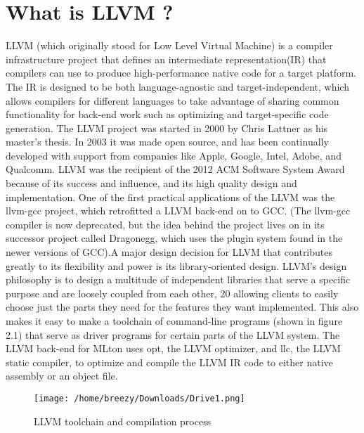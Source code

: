 \documentclass{book}
\begin{document}
	\section{What is LLVM ?}
	LLVM (which originally stood for Low Level Virtual Machine) is a compiler infrastructure project that defines an intermediate representation(IR) that compilers can use to produce high-performance native code for a target platform. The IR is designed to be both language-agnostic and target-independent, which allows compilers for different languages to take advantage of sharing common functionality for back-end work such as optimizing and target-specific code generation. The LLVM project was started in 2000 by Chris Lattner as his master's thesis. In 2003 it was made open source, and has been continually developed with support from companies like Apple, Google, Intel, Adobe, and Qualcomm. LLVM was the recipient of the 2012 ACM Software System Award because of its success and influence, and its high quality design and implementation. One of the first practical applications of the LLVM was the llvm-gcc project, which retrofitted a LLVM back-end on to GCC. (The llvm-gcc compiler is now deprecated, but the idea behind the project lives on in its successor project called Dragonegg, which uses the plugin system found in the newer versions of GCC).\linebreak \linebreak A major design decision for LLVM that contributes greatly to its flexibility and power is its library-oriented design.  LLVM’s design philosophy is to design a multitude of independent libraries that serve a specific purpose and are loosely coupled from each other, 20 allowing clients to easily choose just the parts they need for the features they want implemented. This also makes it easy to make a toolchain of command-line programs (shown in	figure 2.1) that serve as driver programs for certain parts of the LLVM system. The LLVM back-end for MLton uses opt, the LLVM optimizer, and llc, the LLVM static compiler, to optimize and compile the LLVM IR code to either native assembly or an object file.
	
	\begin{figure}
		\texttt{[image: /home/breezy/Downloads/Drive1.png]}
		\caption{LLVM toolchain and compilation process}
		\label{fig:2.1}
	\end{figure}
	
\end{document}
